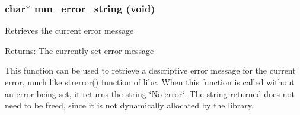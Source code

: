 \subsubsection{\setlength{\rightskip}{0pt plus 5cm}char$\ast$ mm\_\-error\_\-string (void)}\label{group__error_g8654857a3ac349b87d798902912371a3}


Retrieves the current error message

\begin{Desc}
\item[Returns:]The currently set error message\end{Desc}
This function can be used to retrieve a descriptive error message for the current error, much like strerror() function of libc. When this function is called without an error being set, it returns the string \char`\"{}No error\char`\"{}. The string returned does not need to be freed, since it is not dynamically allocated by the library. 